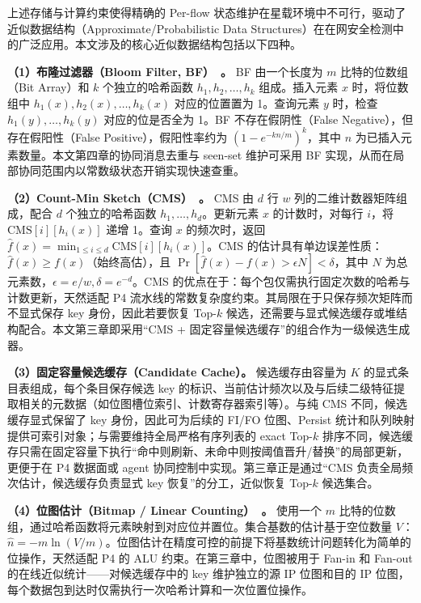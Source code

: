上述存储与计算约束使得精确的 Per-flow 状态维护在星载环境中不可行，驱动了近似数据结构（Approximate/Probabilistic Data Structures）在在网安全检测中的广泛应用。本文涉及的核心近似数据结构包括以下四种。

\textbf{（1）布隆过滤器（Bloom Filter, BF）~\cite{bloom1970space}。} BF 由一个长度为 $m$ 比特的位数组（Bit Array）和 $k$ 个独立的哈希函数 $h_1, h_2, \ldots, h_k$ 组成。插入元素 $x$ 时，将位数组中 $h_1(x), h_2(x), \ldots, h_k(x)$ 对应的位置置为 1。查询元素 $y$ 时，检查 $h_1(y), \ldots, h_k(y)$ 对应的位是否全为 1。BF 不存在假阴性（False Negative），但存在假阳性（False Positive），假阳性率约为 $(1-e^{-kn/m})^k$，其中 $n$ 为已插入元素数量。本文第四章的协同消息去重与 seen-set 维护可采用 BF 实现，从而在局部协同范围内以常数级状态开销实现快速查重。

\textbf{（2）Count-Min Sketch（CMS）~\cite{cormode2005count}。} CMS 由 $d$ 行 $w$ 列的二维计数器矩阵组成，配合 $d$ 个独立的哈希函数 $h_1, \ldots, h_d$。更新元素 $x$ 的计数时，对每行 $i$，将 $\text{CMS}[i][h_i(x)]$ 递增 1。查询 $x$ 的频次时，返回 $\hat{f}(x) = \min_{1 \leq i \leq d} \text{CMS}[i][h_i(x)]$。CMS 的估计具有单边误差性质：$\hat{f}(x) \geq f(x)$（始终高估），且 $\Pr[\hat{f}(x) - f(x) > \epsilon N] < \delta$，其中 $N$ 为总元素数，$\epsilon = e/w, \delta = e^{-d}$。CMS 的优点在于：每个包仅需执行固定次数的哈希与计数更新，天然适配 P4 流水线的常数复杂度约束。其局限在于只保存频次矩阵而不显式保存 key 身份，因此若要恢复 Top-$k$ 候选，还需要与显式候选缓存或堆结构配合。本文第三章即采用“CMS + 固定容量候选缓存”的组合作为一级候选生成器。

\textbf{（3）固定容量候选缓存（Candidate Cache）。} 候选缓存由容量为 $K$ 的显式条目表组成，每个条目保存候选 key 的标识、当前估计频次以及与后续二级特征提取相关的元数据（如位图槽位索引、计数寄存器索引等）。与纯 CMS 不同，候选缓存显式保留了 key 身份，因此可为后续的 FI/FO 位图、Persist 统计和队列映射提供可索引对象；与需要维持全局严格有序列表的 exact Top-$k$ 排序不同，候选缓存只需在固定容量下执行“命中则刷新、未命中则按阈值晋升/替换”的局部更新，更便于在 P4 数据面或 agent 协同控制中实现。第三章正是通过“CMS 负责全局频次估计，候选缓存负责显式 key 恢复”的分工，近似恢复 Top-$k$ 候选集合。

\textbf{（4）位图估计（Bitmap / Linear Counting）~\cite{whang1990linear}。} 使用一个 $m$ 比特的位数组，通过哈希函数将元素映射到对应位并置位。集合基数的估计基于空位数量 $V$：$\hat{n} = -m \ln(V/m)$。位图估计在精度可控的前提下将基数统计问题转化为简单的位操作，天然适配 P4 的 ALU 约束。在第三章中，位图被用于 Fan-in 和 Fan-out 的在线近似统计——对候选缓存中的 key 维护独立的源 IP 位图和目的 IP 位图，每个数据包到达时仅需执行一次哈希计算和一次位置位操作。


